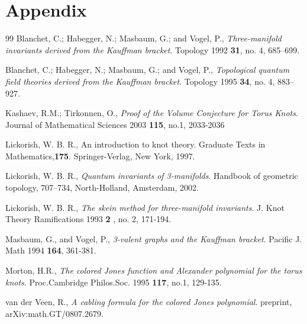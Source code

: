 \documentclass[10pt]{amsart}
\begin{document}
\section{Appendix}\label{apendix}

\begin{thebibliography}{99}
   Blanchet, C.; Habegger, N.; Masbaum, G.; and Vogel, P., {\sl Three-manifold invariants derived from the Kauffman bracket}. Topology 1992 {\bf 31}, no. 4, 685--699.

   Blanchet, C.; Habegger, N.; Masbaum, G.; and Vogel, P., {\sl Topological quantum field theories derived from the Kauffman bracket}. Topology 1995 {\bf 34}, no. 4, 883--927.

   Kashaev, R.M.; Tirkonnen, O., {\sl  Proof of the Volume Conjecture for Torus
Knots}. Journal of Mathematical Sciences 2003 {\bf 115}, no.1,
2033-2036

   Lickorish, W. B. R., An introduction to knot theory. Graduate Texts in Mathematics,{\bf 175}. Springer-Verlag, New York, 1997.

   Lickorish, W. B. R.,  {\sl Quantum invariants of 3-manifolds}.  Handbook of geometric topology,  707--734, North-Holland, Amsterdam, 2002.

   Lickorish, W. B. R., {\sl The skein method for three-manifold invariants}. J. Knot Theory Ramifications 1993 {\bf 2} , no. 2, 171-194.

   Masbaum, G., and Vogel, P., {\sl 3-valent graphs and the Kauffman bracket}.  Pacific J. Math 1994 {\bf 164}, 361-381.

   Morton, H.R., {\sl The colored Jones function and Alexander polynomial for the torus knots}. Proc.Cambridge Philos.Soc. 1995 {\bf 117}, no.1, 129-135.
  
   van der Veen, R., {\sl A cabling formula for the colored Jones polynomial}. preprint, arXiv:math.GT/0807.2679.



\end{thebibliography}
\end{document}
